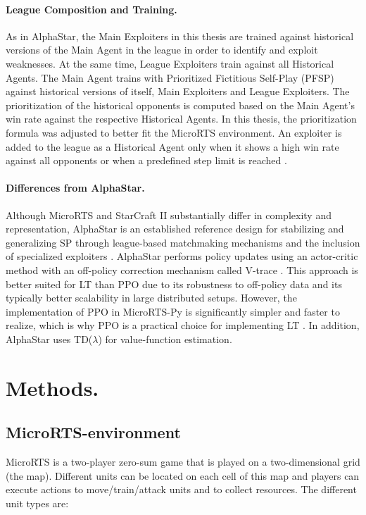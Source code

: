 \documentclass[10pt,twocolumn,letterpaper]{article}
\begin{document}
\paragraph{League Composition and Training.}
As in AlphaStar, the Main Exploiters in this thesis are trained against historical versions of the Main Agent in the league in order to identify and exploit weaknesses.
At the same time, League Exploiters train against all Historical Agents.
The Main Agent trains with Prioritized Fictitious Self-Play (PFSP) against historical versions of itself, Main Exploiters and League Exploiters.
The prioritization of the historical opponents is computed based on the Main Agent’s win rate against the respective Historical Agents.
In this thesis, the prioritization formula was adjusted to better fit the MicroRTS environment.
An exploiter is added to the league as a Historical Agent only when it shows a high win rate against all opponents or when a predefined step limit is reached \cite{vinyals2019alphastar}. 

\paragraph{Differences from AlphaStar.}
Although MicroRTS and StarCraft II substantially differ in complexity and representation, AlphaStar is an established reference design for stabilizing and generalizing SP through league-based matchmaking mechanisms and the inclusion of specialized exploiters \cite{vinyals2019alphastar}.
AlphaStar performs policy updates using an actor-critic method with an off-policy correction mechanism called V-trace \cite{espeholt2018impala, vinyals2019alphastar}.
This approach is better suited for LT than PPO due to its robustness to off-policy data and its typically better scalability in large distributed setups.
However, the implementation of PPO in MicroRTS-Py is significantly simpler and faster to realize, which is why PPO is a practical choice for implementing LT \cite{vinyals2019alphastar}.
In addition, AlphaStar uses TD($\lambda$) \cite{suttonbarto1998rl} for value-function estimation.


\section{Methods.}
\label{sec:Methods}
\subsection{MicroRTS-environment}
\label{sec:MicroRTS-environment}
MicroRTS is a two-player zero-sum game that is played on a two-dimensional grid (the map).
Different units can be located on each cell of this map and players can execute actions to move/train/attack units and to collect resources.
The different unit types are:
\end{document}
